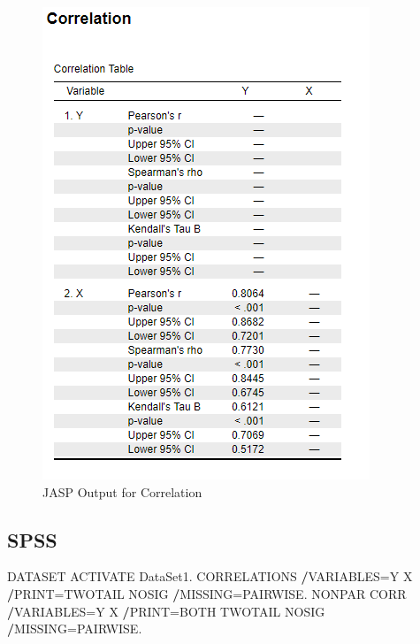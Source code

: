 \documentclass[
]{book}
\newenvironment{Shaded}{\begin{snugshade}}{\end{snugshade}}
\newcommand{\NormalTok}[1]{#1}
\newcommand{\OperatorTok}[1]{\textcolor[rgb]{0.81,0.36,0.00}{\textbf{#1}}}
\begin{document}
\begin{figure}[!h]
\includegraphics{Screenshots/Correlation/corrJASP} \caption{\label{fig:corrJASP}JASP Output for Correlation}\label{fig:corrJASP}
\end{figure}

\hypertarget{spss}{%
\subsection{SPSS}\label{spss}}

\begin{Shaded}
\begin{Highlighting}[]
\NormalTok{DATASET ACTIVATE DataSet1.}
\NormalTok{CORRELATIONS}
  \OperatorTok{/}\NormalTok{VARIABLES=Y X}
  \OperatorTok{/}\NormalTok{PRINT=TWOTAIL NOSIG}
  \OperatorTok{/}\NormalTok{MISSING=PAIRWISE.}
\NormalTok{NONPAR CORR}
  \OperatorTok{/}\NormalTok{VARIABLES=Y X}
  \OperatorTok{/}\NormalTok{PRINT=BOTH TWOTAIL NOSIG}
  \OperatorTok{/}\NormalTok{MISSING=PAIRWISE.}
\end{Highlighting}
\end{Shaded}
\end{document}
